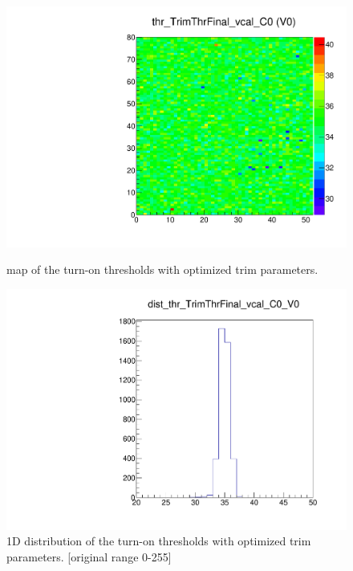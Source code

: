 \begin{figure}[!Hp]
\centering
\begin{minipage}{0.45\textwidth}
  \includegraphics[width=1.0\textwidth]{figures/trim_thr_TrimThrFinal_vcal.pdf}
  \caption{\roc map of the \vcal turn-on thresholds with optimized trim parameters.}
  \label{fig:trim_thr_TrimThrFinal_vcal}
\end{minipage}
\hspace{0.3cm}
\begin{minipage}{0.45\textwidth}
  \includegraphics[width=1.0\textwidth]{figures/trim_dist_thr_TrimThrFinal_vcal.pdf}
  \caption{1D distribution of the \vcal turn-on thresholds with optimized trim parameters. [original range 0-255]}
  \label{fig:trim_dist_thr_TrimThrFinal_vcal}
\end{minipage}
\end{figure}


